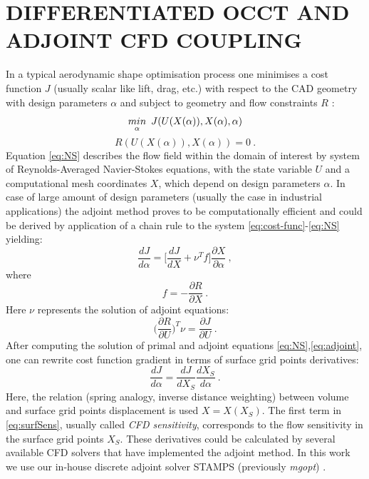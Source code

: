 \documentclass[9pt,academicons]{article}
\begin{document}
\section{DIFFERENTIATED OCCT AND ADJOINT CFD COUPLING}
In a typical aerodynamic shape optimisation process one minimises a cost function $J$ (usually scalar like lift, drag, etc.) with respect to the CAD geometry with design parameters $\alpha$ and subject to geometry and flow constraints $R$ \cite{jameson88aerodynamic}:
\begin{equation}
\label{eq:cost-func}
\underset{\alpha}{min} \hspace{0.5em} J(U(X(\alpha)), X(\alpha), \alpha)
\end{equation}
\begin{equation}
\label{eq:NS}
R(U(X(\alpha)), X(\alpha)) = 0\:. 
\end{equation}
Equation \eqref{eq:NS} describes the flow field within the domain of interest by system of Reynolds-Averaged Navier-Stokes equations, with the state variable $U$ and a computational mesh coordinates $X$, which depend on design parameters $\alpha$. In case of large amount of design parameters (usually the case in industrial applications) the adjoint method proves to be computationally efficient and could be derived by application of a chain rule to the system \eqref{eq:cost-func}-\eqref{eq:NS} yielding:
\begin{equation}
\label{eq:sens}
\dfrac{dJ}{d\alpha}=\Big[ \frac{dJ}{dX} +\nu^Tf \Big]\frac{\partial X}{\partial \alpha}\:,
\end{equation}
where 
\begin{equation}
f = -\frac{\partial R}{\partial X}\:.
\end{equation}
Here $\nu$ represents the solution of adjoint equations:
\begin{equation}
\label{eq:adjoint}
\Big ( \frac{\partial R}{\partial U}\Big)^T\nu=\frac{\partial J}{\partial U}\:.
\end{equation}
After computing the solution of primal and adjoint equations \eqref{eq:NS},\eqref{eq:adjoint}, one can rewrite cost function gradient in terms of surface grid points derivatives:
\begin{equation}
\label{eq:surfSens}
\frac{dJ}{d\alpha}=\frac{dJ}{dX_S}\frac{dX_S}{d\alpha}\:.
\end{equation}
Here, the relation (spring analogy, inverse distance weighting) between volume and surface grid points displacement is used $X = X(X_S)$. 
The first term in \eqref{eq:surfSens}, usually called \textit{CFD sensitivity}, corresponds to the flow sensitivity in the surface grid points $X_S$. These derivatives could be calculated by several available CFD solvers that have implemented the adjoint method. In this work we use our in-house discrete adjoint solver STAMPS (previously \textit{mgopt}) \cite{xu2015thesis}. 
\end{document}
